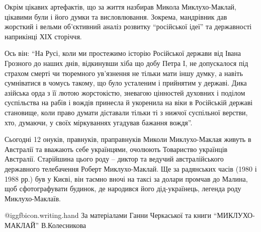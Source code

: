 Окрім цікавих артефактів, що за життя назбирав Микола Миклухо-Маклай, цікавими
були і його думки та висловлювання. Зокрема, мандрівник дав жорсткий і вельми
об'єктивний аналіз розвитку \enquote{російської ідеї} та державності наприкінці ХІХ
сторіччя.

Ось він: \enquote{На Русі, коли ми простежимо історію Російської держави від Івана
Грозного до наших днів, відкинувши хіба що добу Петра I, не допускалося під
страхом смерті чи тюремного ув'язнення не тільки мати іншу думку, а навіть
сумніватися в чомусь такому, що було усталеним і прийнятим у державі. Дика
азійська орда з її лютою жорстокістю, зневагою цінностей духовних і поділом
суспільства на рабів і вождів принесла й укоренила на віки в Російській державі
становище, коли право думати діставали тільки ті з нижчої суспільної верстви,
хто, думаючи, у своїх міркуваннях угадував бажання вождя}.

Сьогодні 12 онуків, правнуків, праправнуків Миколи Миклухо-Маклая живуть в
Австралії та вважають себе українцями, очолюють Товариство українців Австралії.
Старійшина цього роду – диктор та ведучий австралійського державного
телебачення Роберт Миклухо-Маклай. Ще за радянських часів (1980 і 1988 рр.) був
у Києві, він таємно вночі на таксі за долари промчав до Малина, щоб
сфотографувати будинок, де народився його дід-українець, легенда роду
Миклухо-Маклаїв.

@igg{fbicon.writing.hand} За матеріалами Ганни Черкаської та книги \enquote{МИКЛУХО-МАКЛАЙ} В.Колесникова

